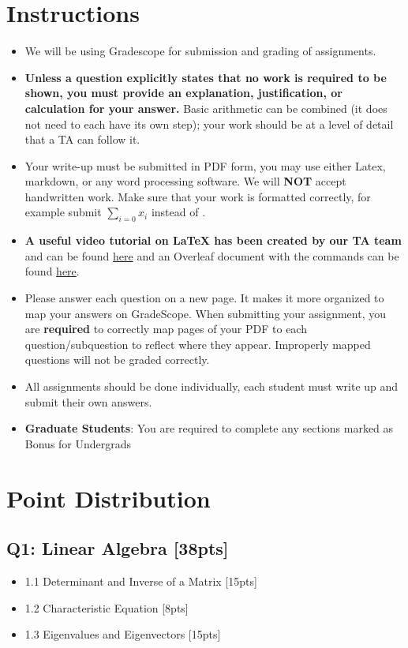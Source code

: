 \documentclass{article}
\begin{document}
\section*{Instructions}
\begin{itemize}
    \item We will be using Gradescope for submission and grading of assignments. 
    \item \textbf{Unless a question explicitly states that no work is required to be shown, you must provide an explanation, justification, or calculation for your answer.} Basic arithmetic can be combined (it does not need to each have its own step); your work should be at a level of detail that a TA can follow it.
    \item Your write-up must be submitted in PDF form, you may use either Latex,  markdown, or any word processing software. \color{red}We will \textbf{NOT} accept handwritten work. \color{black}Make sure that your work is formatted correctly, for example submit $\sum_{i=0} x_i$ instead of . 
    \item \textbf{A useful video tutorial on LaTeX has been created by our TA team} and can be found \href{https://www.dropbox.com/s/wywx114wtfoweru/Latex\%20Tutorial.mp4?dl=0}{here} and an Overleaf document with the commands can be found \href{https://www.overleaf.com/read/yjxbshkffvkm}{here}.

    \item Please answer each question on a new page. It makes it more organized to map your answers on GradeScope. When submitting your assignment, you are \textbf{required} to correctly map pages of your PDF to each question/subquestion to reflect where they appear. Improperly mapped questions will not be graded correctly.
    \item All assignments should be done individually, each student must write up and submit their own answers.
    \item \color{red}\textbf{Graduate Students}\color{black}: You are required to complete any sections marked as Bonus for Undergrads
\end{itemize}
\newpage

\section*{Point Distribution}
\subsection*{Q1: Linear Algebra [38pts]}
\begin{itemize}
    \item 1.1 Determinant and Inverse of a Matrix [15pts]
    \item 1.2 Characteristic Equation [8pts]
    \item 1.3 Eigenvalues and Eigenvectors [15pts]
\end{itemize}
\end{document}
